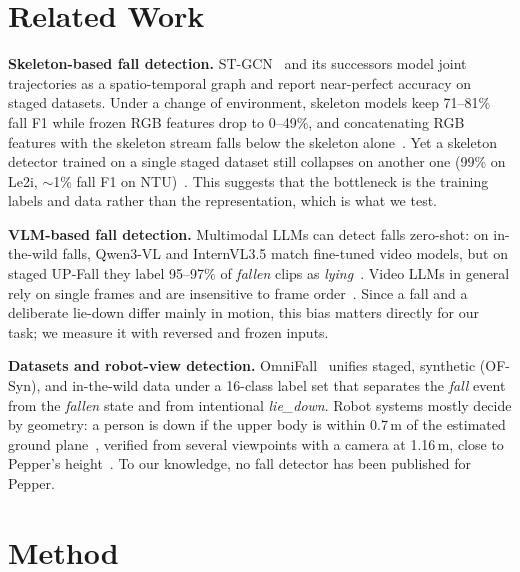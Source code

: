 \section{Related Work}

\textbf{Skeleton-based fall detection.}
ST-GCN~\citep{yan2018stgcn} and its successors model joint trajectories as a spatio-temporal graph and report near-perfect accuracy on staged datasets.
Under a change of environment, skeleton models keep 71--81\% fall F1 while frozen RGB features drop to 0--49\%, and concatenating RGB features with the skeleton stream falls below the skeleton alone~\citep{lamsal2026safer}.
Yet a skeleton detector trained on a single staged dataset still collapses on another one (99\% on Le2i, $\sim$1\% fall F1 on NTU)~\citep{zobi2025vira}.
This suggests that the bottleneck is the training labels and data rather than the representation, which is what we test.

\textbf{VLM-based fall detection.}
Multimodal LLMs can detect falls zero-shot: on in-the-wild falls, Qwen3-VL and InternVL3.5 match fine-tuned video models, but on staged UP-Fall they label 95--97\% of \emph{fallen} clips as \emph{lying}~\citep{schneider2025omnifall}.
Video LLMs in general rely on single frames and are insensitive to frame order~\citep{liu2024tempcompass}.
Since a fall and a deliberate lie-down differ mainly in motion, this bias matters directly for our task; we measure it with reversed and frozen inputs.

\textbf{Datasets and robot-view detection.}
OmniFall~\citep{schneider2025omnifall} unifies staged, synthetic (OF-Syn), and in-the-wild data under a 16-class label set that separates the \emph{fall} event from the \emph{fallen} state and from intentional \emph{lie\_down}.
Robot systems mostly decide by geometry: a person is down if the upper body is within 0.7\,m of the estimated ground plane~\citep{solbach2017fallen}, verified from several viewpoints with a camera at 1.16\,m, close to Pepper's height~\citep{antonello2017fallen}.
To our knowledge, no fall detector has been published for Pepper.

\section{Method}

